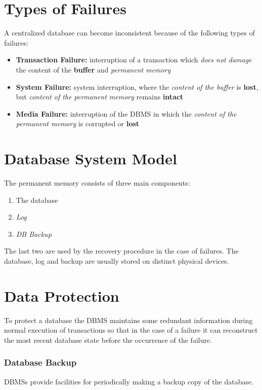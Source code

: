 \section{Types of Failures}
A centralized database can become inconsistent because of the following types of failures:
\begin{itemize}
    \item \textbf{Transaction Failure:} interruption of a transaction which \textit{does not damage} the content of the \textbf{buffer} and \textit{permanent memory}
    \item \textbf{System Failure:} system interruption, where the \textit{content of the buffer} is \textbf{lost}, but \textit{content of the permanent memory} remains \textbf{intact}
    \item \textbf{Media Failure:}  interruption of the DBMS in which the \textit{content of the permanent memory} is corrupted or \textbf{lost}
\end{itemize}

\section{Database System Model}
The permanent memory consists of three main components:
\begin{enumerate}
    \item The database
    \item \textit{Log}
    \item \textit{DB Backup}
\end{enumerate}
The last two are used by the recovery procedure in the case of failures. The database, log and backup are usually stored on distinct physical devices.

\section{Data Protection}
To protect a database the DBMS maintains some redundant information during normal execution of transactions so that in the case of a failure it can reconstruct the most recent database state before the occurrence of the failure.

\subsubsection{Database Backup}
DBMSs provide facilities for periodically making a backup copy of the database.

